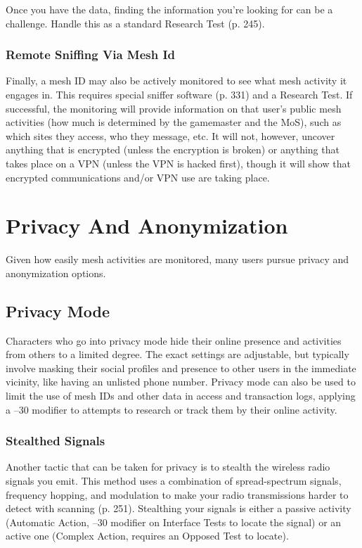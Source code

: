 Once you have the data, finding the information 
you're looking for can be a challenge. Handle this as 
a standard Research Test (p. 245).

\subsubsection{Remote Sniffing Via Mesh Id}

Finally, a mesh ID may also be actively monitored 
to see what mesh activity it engages in. This requires 
special sniffer software (p. 331) and a Research Test. 
If successful, the monitoring will provide information 
on that user's public mesh activities (how much is 
determined by the gamemaster and the MoS), such 
as which sites they access, who they message, etc. It 
will not, however, uncover anything that is encrypted 
(unless the encryption is broken) or anything that 
takes place on a VPN (unless the VPN is hacked first), 
though it will show that encrypted communications 
and/or VPN use are taking place.

\section{Privacy And Anonymization}

Given how easily mesh activities are monitored, many 
users pursue privacy and anonymization options.

\subsection{Privacy Mode}

Characters who go into privacy mode hide their online 
presence and activities from others to a limited degree. 
The exact settings are adjustable, but typically involve 
masking their social profiles and presence to other 
users in the immediate vicinity, like having an unlisted 
phone number. Privacy mode can also be used to limit 
the use of mesh IDs and other data in access and 
transaction logs, applying a –30 modifier to attempts 
to research or track them by their online activity.

\subsubsection{Stealthed Signals}

Another tactic that can be taken for privacy is to stealth 
the wireless radio signals you emit. This method uses 
a combination of spread-spectrum signals, frequency 
hopping, and modulation to make your radio transmissions
harder to detect with scanning (p. 251). Stealthing
your signals is either a passive activity (Automatic
Action, –30 modifier on Interface Tests to locate the 
signal) or an active one (Complex Action, requires an 
Opposed Test to locate).

